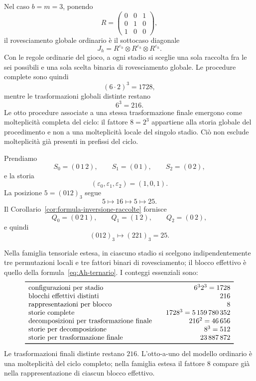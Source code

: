 	Nel caso \(b=m=3\), ponendo
	\[
	R=
	\begin{pmatrix}
	0&0&1\\
	0&1&0\\
	1&0&0
	\end{pmatrix},
	\]
	il rovesciamento globale ordinario è il sottocaso diagonale
	\[
	J_h
	=
	R^{\varepsilon_h}\otimes
	R^{\varepsilon_h}\otimes
	R^{\varepsilon_h}.
	\]
	Con le regole ordinarie del gioco, a ogni stadio si sceglie una sola
	raccolta fra le sei possibili e una sola scelta binaria di rovesciamento globale. Le
	procedure complete sono quindi
	\[
	(6\cdot2)^3=1728,
	\]
	mentre le trasformazioni globali distinte restano
	\[
	6^3=216.
	\]
	Le otto procedure associate a una stessa trasformazione finale emergono
	come molteplicità completa del ciclo: il fattore \(8=2^3\) appartiene alla
	storia globale del procedimento e non a una molteplicità locale del singolo
	stadio. Ciò non esclude molteplicità già presenti in prefissi del ciclo.

	\begin{example}
		Prendiamo
		\[
		S_0=(0\,1\,2),\qquad S_1=(0\,1),\qquad S_2=(0\,2),
		\]
		e la storia
		\[
		(\varepsilon_0,\varepsilon_1,\varepsilon_2)=(1,0,1).
		\]
		La posizione \(5=(012)_3\) segue
		\[
		5\longmapsto16\longmapsto5\longmapsto25.
		\]
		Il Corollario~\ref{cor:formula-inversione-raccolte} fornisce
		\[
		Q_0=(0\,2\,1),\qquad Q_1=(1\,2),\qquad Q_2=(0\,2),
		\]
		e quindi
		\[
		(012)_3\longmapsto(221)_3=25.
		\]
	\end{example}

	Nella famiglia tensoriale estesa, in ciascuno stadio si scelgono
	indipendentemente tre permutazioni locali e tre fattori binari di
	rovesciamento; il blocco effettivo è quello della
	formula~\eqref{eq:Ah-ternario}. I conteggi essenziali sono:
	\[
	\begin{array}{l@{\qquad}r}
	\toprule
	\text{configurazioni per stadio} & 6^3 2^3=1728\\
	\text{blocchi effettivi distinti} & 216\\
	\text{rappresentazioni per blocco} & 8\\
	\text{storie complete} & 1728^3=5\,159\,780\,352\\
	\text{decomposizioni per trasformazione finale} & 216^2=46\,656\\
	\text{storie per decomposizione} & 8^3=512\\
	\text{storie per trasformazione finale} & 23\,887\,872\\
	\bottomrule
	\end{array}
	\]
	Le trasformazioni finali distinte restano \(216\). L'otto-a-uno del modello
	ordinario è una molteplicità del ciclo completo; nella famiglia estesa il
	fattore \(8\) compare già nella rappresentazione di ciascun blocco effettivo.

